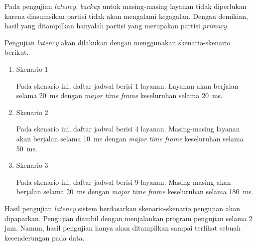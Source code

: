 Pada pengujian \textit{latency}, \textit{backup} untuk masing-masing layanan tidak diperlukan
karena diasumsikan partisi tidak akan mengalami kegagalan. Dengan demikian, hasil yang
ditampilkan hanyalah partisi yang merupakan partisi \textit{primary}.

Pengujian \textit{latency} akan dilakukan dengan menggunakan skenario-skenario berikut.

\begin{enumerate}
	\item Skenario 1

		Pada skenario ini, daftar jadwal berisi 1 layanan. Layanan akan berjalan
		selama \SI{20}{\milli\second} dengan \textit{major time frame} keseluruhan
		selama \SI{20}{\milli\second}.

	\item Skenario 2

		Pada skenario ini, daftar jadwal berisi 4 layanan. Masing-masing layanan akan
		berjalan selama \SI{10}{\milli\second} dengan \textit{major time frame}
		keseluruhan selama \SI{50}{\milli\second}.

	\item Skenario 3

		Pada skenario ini, daftar jadwal berisi 9 layanan. Masing-masing akan berjalan
		selama \SI{20}{\milli\second} dengan \textit{major time frame} keseluruhan
		selama \SI{180}{\milli\second}.

\end{enumerate}

Hasil pengujian \textit{latency} sistem berdasarkan skenario-skenario pengujian akan dipaparkan.
Pengujian diambil dengan menjalankan program pengujian selama 2 jam. Namun, hasil pengujian
hanya akan ditampilkan sampai terlihat sebuah kecenderungan pada data.

